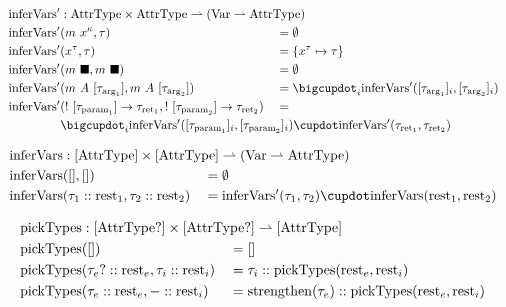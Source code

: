 \newcommand{\inferVarsDash}{\mathrm{inferVars'}}

\begin{alignat*}{3}
	\inferVarsDash &: \mathrlap{\AttrType \times \AttrType \rightharpoonup (\Var \rightharpoonup \AttrType)} \\
	\inferVarsDash&(m\ x^\kappa, \tau) &&= \emptyset \\
	\inferVarsDash&(x^\tau, \tau) &&= \{ x^\tau \mapsto \tau \} \\
	\inferVarsDash&(m\ \blacksquare, m\ \blacksquare) &&= \emptyset \\
	\inferVarsDash&(m\ A\ [\tau_{\arrg_1}], m\ A\ [\tau_{\arrg_2}]) &&= \bigcupdot_i \inferVarsDash([\tau_{\arrg_1}]_i, [\tau_{\arrg_2}]_i) \\
	\inferVarsDash&(!\ [\tau_{\param_1}] \to \tau_{\ret_1}, !\ [\tau_{\param_2}] \to \tau_{\ret_2}) &&= \\
	&\mathrlap{\bigcupdot_i \inferVarsDash([\tau_{\param_1}]_i, [\tau_{\param_2}]_i) \cupdot \inferVarsDash(\tau_{\ret_1}, \tau_{\ret_2})}
\end{alignat*}

\newcommand{\inferVars}{\mathrm{inferVars}}

\begin{alignat*}{3}
	\inferVars &: \mathrlap{[\AttrType] \times [\AttrType] \rightharpoonup (\Var \rightharpoonup \AttrType)} \\
	\inferVars&([], []) &&= \emptyset \\
	\inferVars&(\tau_1 :: \rest_1, \tau_2 :: \rest_2) &&= \inferVarsDash(\tau_1, \tau_2) \cupdot \inferVars(\rest_1, \rest_2) \\
\end{alignat*}

\newcommand{\pickTypes}{\mathrm{pickTypes}}

\begin{alignat*}{3}
	\pickTypes &: \mathrlap{[\AttrType?] \times [\AttrType?] \rightharpoonup [\AttrType]} \\
	\pickTypes&([]) &&= [] \\
	\pickTypes&(\tau_e? :: \rest_e, \tau_i :: \rest_i) &&= \tau_i :: \pickTypes(\rest_e, \rest_i) \\
	\pickTypes&(\tau_e :: \rest_e, - :: \rest_i) &&= \strengthen(\tau_e) :: \pickTypes(\rest_e, \rest_i) \\
\end{alignat*}

\newcommand{\inferTypeArgs}{\mathrm{inferTypeArgs}}

